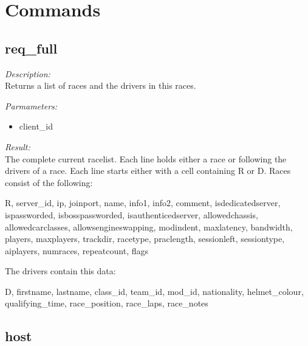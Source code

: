 \section{Commands}

\subsection{req\_full}

\begin{description}
\item {\it Description:}\\
Returns a list of races and the drivers in this races.
\item {\it Parmameters:}
\begin{itemize}
\item client\_id
\end{itemize}
\item {\it Result:}\\
The complete current racelist. Each line holds either a race or following the drivers of a race. Each line starts either with a cell containing R or D. Races consist of the following: 
				
			R, 
			server\_id, 
			ip, 
			joinport, 
			name, 
			info1, 
			info2, 
			comment, 
			isdedicatedserver, 
			ispassworded, 
			isbosspassworded, 
			isauthenticedserver, 
			allowedchassis, 
			allowedcarclasses, 
			allowsengineswapping, 
			modindent, 
			maxlatency, 
			bandwidth, 
			players,
			maxplayers, 
			trackdir, 
			racetype, 
			praclength, 
			sessionleft, 
			sessiontype,
			aiplayers,
			numraces,
			repeatcount,
			flags


			The drivers contain this data:

			D,
			firstname,
			lastname,
			class\_id,
			team\_id,
			mod\_id,
			nationality,
			helmet\_colour,
			qualifying\_time,
			race\_position,
			race\_laps,
			race\_notes
			
\end{description}

\subsection{host}

